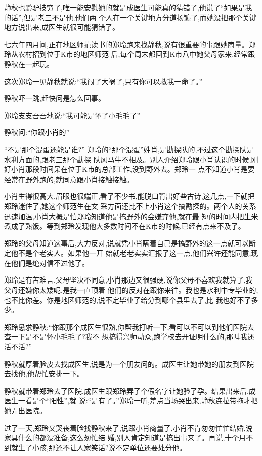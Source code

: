 ﻿\documentclass[12pt]{article}
\begin{document}
静秋也黔驴技穷了,唯一能安慰她的就是成医生可能真的猜错了,他说了``如果是我的话'',但是老三不是他,他们两
个人在一个关键地方分道扬镳了,而她没把那个关键地方说出来,成医生就很可能猜错了。

七六年四月间,正在地区师范读书的郑玲跑来找静秋,说有很重要的事跟她商量。郑玲从农村招到位于K市的地区师范
后,每个周末都回到K市八中她父母家来,经常跟静秋在一起玩。

这次郑玲一见静秋就说:``我闯了大祸了,只有你可以救我一命了。''

静秋吓一跳,赶快问是怎么回事。

郑玲支支吾吾地说:``我\myrule 可能是\myrule 怀了小毛毛了\myrule ''

静秋问:``你\myrule 跟\myrule 小肖的\myrule ''

``不是那个混蛋还能是谁?'' 郑玲的``那个混蛋''姓肖,是勘探队的,不过这个勘探队是水利方面的,跟老三那个勘探
队风马牛不相及。别人介绍郑玲跟小肖认识的时候,刚好小肖那段时间呆在位于K市的总部工作,没到野外去。郑玲一
点不知道小肖是要经常在野外跑的,就同意跟小肖接触接触。

小肖生得很高大,眉眼也很端正,看了不少书,能脱口背出好些古诗,这几点,一下就把郑玲迷住了,她这个师范生在文
采方面还比不上小肖这个搞勘探的。两个人的关系迅速加温,小肖大概是怕郑玲知道他是搞野外的会嫌弃他,就在最
短的时间内把生米煮成了熟饭。等到郑玲发现他大多数时间不在K市的时候,已经有点来不及了。

郑玲的父母知道这事后,大力反对,说就凭小肖瞒着自己是搞野外的这一点就可以断定他不是个老实人。如果他一开
始就老老实实汇报了这一点,他们兴许还能同意,现在他们是绝对信不过他了。

郑玲是有苦难言,父母坚决不同意,小肖那边又很强硬,说你父母不喜欢我就算了,我父母还嫌你太矮呢,是我一直顶着
他们的反对在跟你来往。我也是水利中专毕业的,也不比你差。你是地区师范的,说不定毕业了给分到哪个县里去了,比
我也好不了多少。

郑玲恳求静秋:``你跟那个成医生很熟,你帮我打听一下,看可以不可以到他们医院去查一下是不是怀小毛毛了?我不
想搞得兴师动众,跑学校去开证明什么的,那叫我还活不活?''

静秋就厚着脸皮去找成医生,说是为一个朋友问的。成医生让她带她的朋友到医院去找他,他帮忙安排一下。

静秋就带着郑玲去了医院,成医生跟郑玲弄了个假名字让她验了孕。结果出来后,成医生一看是个``阳性'',就
说:``是有了。''郑玲一听,差点当场哭出来,静秋连拉带拖才把她弄出医院。

过了一天,郑玲又哭丧着脸找静秋来了,说跟小肖商量了,小肖不肯匆匆忙忙结婚,说家具什么的都没准备,这么匆忙结
婚,别人肯定知道是搞出事来了。再说,十个月不到就生了小孩,那还不让人家笑话?说不定单位还要处分他。
\end{document}
